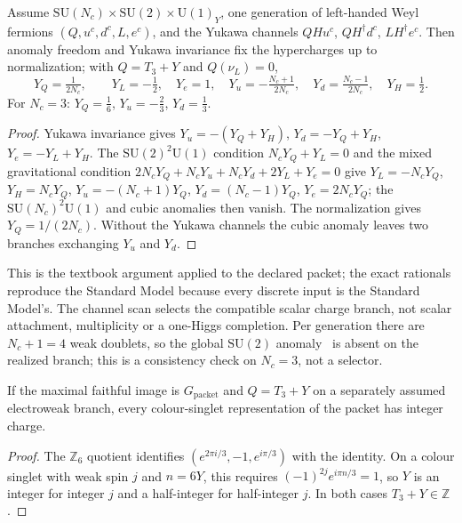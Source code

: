 \documentclass[11pt]{article}
\begin{document}
\begin{theorem}
\label{thm:hypercharge}
Assume \(\mathrm{SU}(N_c)\times\mathrm{SU}(2)\times\mathrm U(1)_Y\), one
generation of left-handed Weyl fermions \((Q,u^c,d^c,L,e^c)\), and the Yukawa
channels \(QHu^c\), \(QH^\dagger d^c\), \(LH^\dagger e^c\). Then anomaly
freedom and Yukawa invariance fix the hypercharges up to normalization; with
\(Q=T_3+Y\) and \(Q(\nu_L)=0\),
\[
Y_Q=\tfrac1{2N_c},\qquad
Y_L=-\tfrac12,\quad Y_e=1,\quad
Y_u=-\tfrac{N_c+1}{2N_c},\quad Y_d=\tfrac{N_c-1}{2N_c},\quad Y_H=\tfrac12.
\]
For \(N_c=3\): \(Y_Q=\tfrac16\), \(Y_u=-\tfrac23\), \(Y_d=\tfrac13\).
\end{theorem}

\begin{proof}
Yukawa invariance gives \(Y_u=-(Y_Q+Y_H)\), \(Y_d=-Y_Q+Y_H\),
\(Y_e=-Y_L+Y_H\). The \(\mathrm{SU}(2)^2\mathrm U(1)\) condition
\(N_cY_Q+Y_L=0\) and the mixed gravitational condition
\(2N_cY_Q+N_cY_u+N_cY_d+2Y_L+Y_e=0\) give \(Y_L=-N_cY_Q\), \(Y_H=N_cY_Q\),
\(Y_u=-(N_c+1)Y_Q\), \(Y_d=(N_c-1)Y_Q\), \(Y_e=2N_cY_Q\); the
\(\mathrm{SU}(N_c)^2\mathrm U(1)\) and cubic anomalies then vanish. The
normalization gives \(Y_Q=1/(2N_c)\). Without the Yukawa channels the cubic
anomaly leaves two branches exchanging \(Y_u\) and \(Y_d\).
\end{proof}

This is the textbook argument applied to the declared packet; the exact
rationals reproduce the Standard Model because every discrete input is the
Standard Model's. The channel scan selects the compatible scalar charge
branch, not scalar attachment, multiplicity or a one-Higgs completion. Per
generation there are \(N_c+1=4\) weak doublets, so the global
\(\mathrm{SU}(2)\) anomaly~\cite{witten82} is absent on the realized branch;
this is a consistency check on \(N_c=3\), not a selector.

\begin{theorem}
If the maximal faithful image is \(G_{\mathrm{packet}}\) and \(Q=T_3+Y\) on a
separately assumed electroweak branch, every colour-singlet representation
of the packet has integer charge.
\end{theorem}

\begin{proof}
The \(\mathbb Z_6\) quotient identifies
\((e^{2\pi i/3},-1,e^{i\pi/3})\) with the identity. On a colour singlet with
weak spin \(j\) and \(n=6Y\), this requires \((-1)^{2j}e^{i\pi n/3}=1\), so
\(Y\) is an integer for integer \(j\) and a half-integer for half-integer
\(j\). In both cases \(T_3+Y\in\mathbb Z\).
\end{proof}
\end{document}

